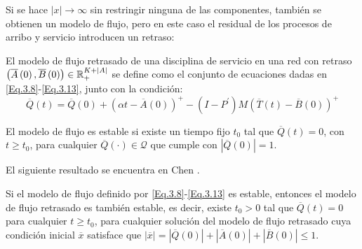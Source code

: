 Si se hace $|x|\rightarrow\infty$ sin restringir ninguna de las
componentes, tambi\'en se obtienen un modelo de flujo, pero en
este caso el residual de los procesos de arribo y servicio
introducen un retraso:

\begin{Def}
El modelo de flujo retrasado de una disciplina de servicio en una
red con retraso
$\left(\overline{A}\left(0\right),\overline{B}\left(0\right)\right)\in\mathbb{R}_{+}^{K+|A|}$
se define como el conjunto de ecuaciones dadas en
\ref{Eq.3.8}-\ref{Eq.3.13}, junto con la condici\'on:
\begin{equation}\label{CondAd.FluidModel}
\overline{Q}\left(t\right)=\overline{Q}\left(0\right)+\left(\alpha
t-\overline{A}\left(0\right)\right)^{+}-\left(I-P^{'}\right)M\left(\overline{T}\left(t\right)-\overline{B}\left(0\right)\right)^{+}
\end{equation}
\end{Def}

\begin{Def}
El modelo de flujo es estable si existe un tiempo fijo $t_{0}$ tal
que $\overline{Q}\left(t\right)=0$, con $t\geq t_{0}$, para
cualquier $\overline{Q}\left(\cdot\right)\in\mathcal{Q}$ que
cumple con $|\overline{Q}\left(0\right)|=1$.
\end{Def}

El siguiente resultado se encuentra en Chen \cite{Chen}.
\begin{Lemma}
Si el modelo de flujo definido por \ref{Eq.3.8}-\ref{Eq.3.13} es
estable, entonces el modelo de flujo retrasado es tambi\'en
estable, es decir, existe $t_{0}>0$ tal que
$\overline{Q}\left(t\right)=0$ para cualquier $t\geq t_{0}$, para
cualquier soluci\'on del modelo de flujo retrasado cuya
condici\'on inicial $\overline{x}$ satisface que
$|\overline{x}|=|\overline{Q}\left(0\right)|+|\overline{A}\left(0\right)|+|\overline{B}\left(0\right)|\leq1$.
\end{Lemma}





